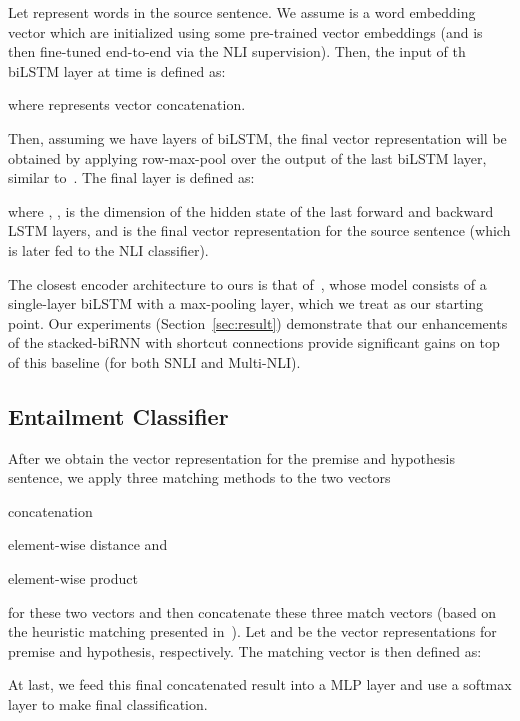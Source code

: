 \documentclass[11pt,letterpaper]{article}
\begin{document}
Let  represent words in the source sentence. We assume  is a word embedding vector which are initialized using some pre-trained vector embeddings (and is then fine-tuned end-to-end via the NLI supervision). Then, the input of th biLSTM layer at time  is defined as:


where  represents vector concatenation.

Then, assuming we have  layers of biLSTM, the final vector representation will be obtained by applying row-max-pool over the output of the last biLSTM layer, similar to~. The final layer is defined as:


where , ,  is the dimension of the hidden state of the last forward and backward LSTM layers, and  is the final vector representation for the source sentence (which is later fed to the NLI classifier).


The closest encoder architecture to ours is that of~, whose model consists of a single-layer biLSTM with a max-pooling layer, which we treat as our starting point. Our experiments (Section~\ref{sec:result}) demonstrate that  our enhancements of the stacked-biRNN with shortcut connections provide significant gains on top of this baseline (for both SNLI and Multi-NLI).


\subsection{Entailment Classifier}
After we obtain the vector representation for the premise and hypothesis sentence, we apply three matching methods to the two vectors \begin{inparaenum}[(i)]
\item{concatenation}
\item{element-wise distance} and
\item{element-wise product}
\end{inparaenum} for these two vectors and then concatenate these three match vectors (based on the heuristic matching presented in~). Let  and  be the vector representations for premise and hypothesis, respectively. The matching vector is then defined as:

At last, we feed this final concatenated result  into a MLP layer and use a softmax layer to make final classification.
\end{document}
